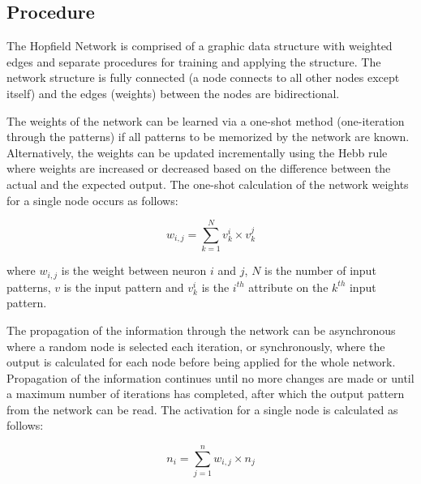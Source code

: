 \subsection{Procedure}
The Hopfield Network is comprised of a graphic data structure with weighted edges and separate procedures for training and applying the structure. The network structure is fully connected (a node connects to all other nodes except itself) and the edges (weights) between the nodes are bidirectional. 

The weights of the network can be learned via a one-shot method (one-iteration through the patterns) if all patterns to be memorized by the network are known. Alternatively, the weights can be updated incrementally using the Hebb rule where weights are increased or decreased based on the difference between the actual and the expected output. The one-shot calculation of the network weights for a single node occurs as follows:

\begin{equation}
	w_{i,j} = \sum_{k=1}^{N} v_k^i \times v_k^j
\end{equation}

where $w_{i,j}$ is the weight between neuron $i$ and $j$, $N$ is the number of input patterns, $v$ is the input pattern and $v_k^i$ is the $i^{th}$ attribute on the $k^{th}$ input pattern.

The propagation of the information through the network can be asynchronous where a random node is selected each iteration, or synchronously, where the output is calculated for each node before being applied for the whole network. Propagation of the information continues until no more changes are made or until a maximum number of iterations has completed, after which the output pattern from the network can be read. The activation for a single node is calculated as follows:

\begin{equation}
	n_i = \sum_{j=1}^n w_{i,j} \times n_j
\end{equation}

